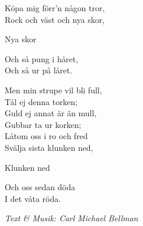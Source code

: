 Köpa mig förr'n någon tror,\\
Rock och väst och nya skor,\par
\hspace{20pt}\revrpt Nya skor\rpt\hspace{5pt}{\footnotesize 4x}\par
Och så pung i håret,\\
Och så ur på låret.\par
\vspace{10pt}
Men min strupe vil bli full,\\
Tål ej denna torken;\\
Guld ej annat är än mull,\\
Gubbar ta ur korken;\\
Låtom oss i ro och fred\\
Svälja sista klunken ned,\par
\hspace{20pt}\revrpt Klunken ned\rpt\hspace{5pt}{\footnotesize 4x}\par
Och oss sedan döda\\
I det våta röda.\par
\vspace{10pt}
{\footnotesize\textit{Text \& Musik: Carl Michael Bellman}} 
